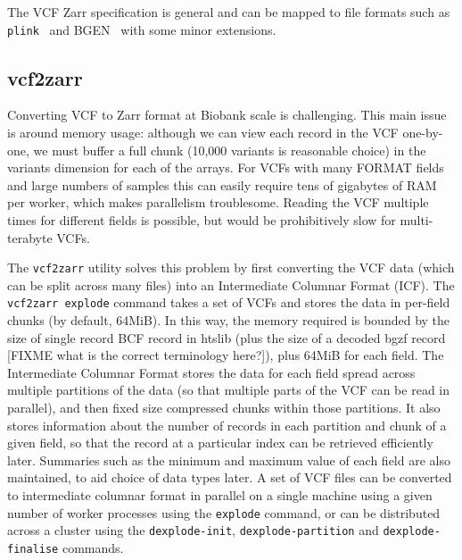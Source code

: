 \documentclass[a4paper,num-refs]{oup-contemporary}
\newcommand{\toolname}[1]{\texttt{#1}}
\begin{document}
The VCF Zarr specification is general and can be mapped to 
file formats such as \toolname{plink}~\citep{purcell2007plink,chang2015second}
and BGEN~\citep{band2018bgen} with some minor extensions.

\subsection{vcf2zarr}
Converting VCF to Zarr format at Biobank scale is challenging. This main issue is 
around memory usage: although we can view each record in the VCF one-by-one,
we must buffer a full chunk (10,000 variants is reasonable choice) 
in the variants dimension for each of the arrays. 
For VCFs with many FORMAT fields and large numbers of samples this can
easily require tens of gigabytes of RAM per worker, which makes 
parallelism troublesome. Reading the VCF multiple times for different fields
is possible, but would be prohibitively slow for multi-terabyte VCFs.

The \texttt{vcf2zarr} utility solves this problem by first converting 
the VCF data (which can be split across many files) into an Intermediate
Columnar Format (ICF). The \texttt{vcf2zarr explode} command takes a set
of VCFs and stores the data in per-field chunks (by default, 64MiB).
In this way, the memory required is bounded by the size of single record 
BCF record in htslib (plus the size of a decoded bgzf record
[FIXME what is the correct terminology here?]), plus 64MiB for each 
field.  The Intermediate Columnar Format stores the data for each 
field spread across multiple partitions of the data (so that 
multiple parts of the VCF can be read in parallel), and then 
fixed size compressed chunks within those partitions. It also stores information
about the number of records in each partition and chunk of a given
field, so that the record at a particular index can be retrieved efficiently 
later. Summaries such as the minimum and maximum value 
of each field are also maintained, to aid choice of data types later.
A set of VCF files can be converted to intermediate columnar 
format in parallel on a single machine using a given number 
of worker processes using the \texttt{explode} command,
or can be distributed across a cluster using the 
\texttt{dexplode-init},
\texttt{dexplode-partition} and \texttt{dexplode-finalise} commands.
\end{document}
